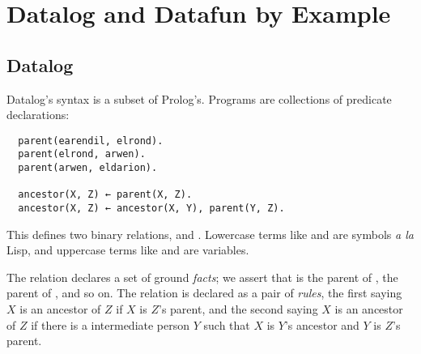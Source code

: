 \section{Datalog and Datafun by Example}
\label{sec:datalog-and-datafun}

\subsection{Datalog}

Datalog's syntax is a subset of Prolog's. Programs
are collections of predicate declarations:

\begin{verbatim}
  parent(earendil, elrond).
  parent(elrond, arwen).
  parent(arwen, eldarion).

  ancestor(X, Z) ← parent(X, Z).
  ancestor(X, Z) ← ancestor(X, Y), parent(Y, Z).
\end{verbatim}

This defines two binary relations,  and . Lowercase
terms like  and  are symbols \emph{a la} Lisp,
and uppercase terms like  and  are variables.

The  relation declares a set of ground \emph{facts}; we assert that
 is the parent of ,  the
parent of , and so on. The  relation is declared as
a pair of \emph{rules}, the first saying $X$ is an ancestor of $Z$ if $X$ is
$Z$'s parent, and the second saying $X$ is an ancestor of $Z$ if there is a
intermediate person $Y$ such that $X$ is $Y$'s ancestor and $Y$ is $Z$'s parent.

% 

